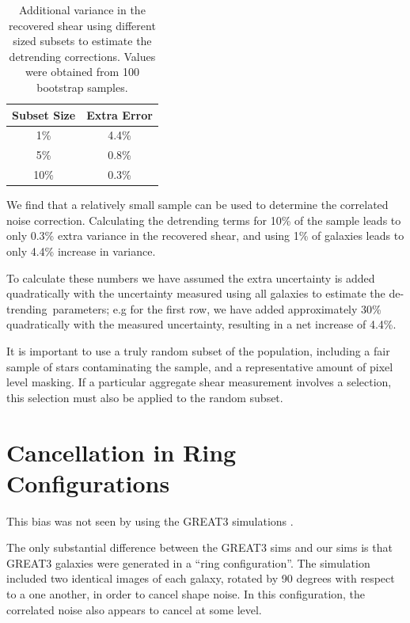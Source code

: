 \documentclass[usegraphicx,usenatbib]{mn2e}
\newcommand{\detrend}{de-trending}
\begin{document}
\begin{table}
    \centering
    \caption{Additional variance in the recovered shear 
        using different sized subsets to
        estimate the detrending corrections.  Values were obtained
        from 100 bootstrap samples. \label{tab:subsets}}
    \begin{tabular}{| c | c |}
        Subset Size & Extra Error \\
        \hline
        1\% & 4.4\% \\
        5\% & 0.8\% \\
        10\% & 0.3\% \\
    \end{tabular}
\end{table}


We find that a relatively small sample can be used to determine the correlated
noise correction.  Calculating the detrending terms for 10\% of the sample
leads to only 0.3\% extra variance in the recovered shear, and using 1\% of
galaxies leads to only 4.4\% increase in variance.

To calculate these numbers we have assumed the extra uncertainty is added
quadratically with the uncertainty measured using all galaxies to estimate the
\detrend\ parameters; e.g for the first row, we have added approximately 30\%
quadratically with the measured uncertainty, resulting in a net increase of
4.4\%.

It is important to use a truly random subset of the population, including a
fair sample of stars contaminating the sample, and a representative amount of
pixel level masking.  If a particular aggregate shear measurement involves a
selection, this selection must also be applied to the random subset.

\section{Cancellation in Ring Configurations}

This bias was not seen by \cite{HuffMcal} using the GREAT3 simulations
\citep{great3}.

The only substantial difference between the GREAT3 sims and our sims is that
GREAT3 galaxies were generated in a ``ring configuration''.  The simulation
included two identical images of each galaxy, rotated by 90 degrees with
respect to a one another, in order to cancel shape noise.  In this configuration,
the correlated noise also appears to cancel at some level.
\end{document}
